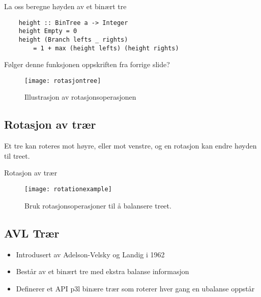 \documentclass{article}
\begin{document}
    \begin{eg}
        La oss beregne høyden av et binært tre

    \begin{lstlisting}
    height :: BinTree a -> Integer
    height Empty = 0
    height (Branch lefts _ rights)
        = 1 + max (height lefts) (height rights)
    \end{lstlisting}

    Følger denne funksjonen oppskriften fra forrige slide?
    \end{eg}


    \begin{figure}[H]
        \begin{center}
            \texttt{[image: rotasjontree]}
        \end{center}
        \caption{Illustrasjon av rotasjonsoperasjonen}
        \label{fig:rotasjontree}
    \end{figure}

    \subsection{Rotasjon av trær}
    Et tre kan roteres mot høyre, eller mot venstre, og en rotasjon kan endre høyden til treet.
    \begin{eg}
        Rotasjon av trær
       \begin{figure}[H]
           \begin{center}
               \texttt{[image: rotationexample]}
           \end{center}
           \caption{Bruk rotasjonsoperasjoner til å balansere treet.}
           \label{fig:rotationexample}
       \end{figure} 

       \begin{figure}[H]
        \centering
        \end{figure}
    \end{eg}

    \subsection{AVL Trær}
    \begin{itemize}
        \item Introdusert av Adelson-Velsky og Landig i 1962
        \item Består av et binært tre med ekstra balanse informasjon
        \item Definerer et API p3l binære trær som roterer hver gang en ubalanse oppstår
    \end{itemize}
\end{document}
